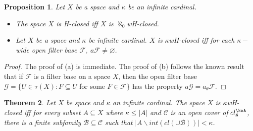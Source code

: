 \documentclass[11pt]{amsart}
\newif\ifdraft\draftfalse
\newtheorem{theorem}{Theorem}[section]
\newtheorem{proposition}[theorem]{Proposition}
\theoremstyle{definition}
\theoremstyle{remark}
\numberwithin{equation}{section}
\begin{document}
\begin{proposition}{{\immediate{}}{\ifdraft\hspace{-\lastskip}\vadjust{\vspace{-1mm}\smash{\llap{{\tt {{propA}}}\hspace{8mm}}}\vspace{1mm}}\fi}}
 Let $X$ be a space and $\kappa$ be an infinite cardinal.
\begin{itemize}
\item[(a)] The space $X$ is H-closed iff $X$ is $\aleph_0$wH-closed.
\item[(b)]  Let $X$ be a space and $\kappa$ be infinite cardinal.  $X$ is $\kappa$wH-closed iff for each $\kappa-$wide open filter base ${\ensuremath{\mathcal{{F}}}}$, $a{\ensuremath{\mathcal{{F}}}}\ne \varnothing$.

\end{itemize}
\end{proposition}

\begin{proof}
The proof of (a) is immediate. The proof of (b) follows the known result that if ${\ensuremath{\mathcal{{F}}}}$ is a filter base on a space $X$, then the open filter base ${\ensuremath{\mathcal{{G}}}} = \{U \in \tau(X): F \subseteq U$ for some $F \in {\ensuremath{\mathcal{{F}}}}\}$ has the property $a{\ensuremath{\mathcal{{G}}}} = a_{\theta}{\ensuremath{\mathcal{{F}}}}$.
\end{proof}

\begin{theorem}{{\immediate{}}{\ifdraft\hspace{-\lastskip}\vadjust{\vspace{-1mm}\smash{\llap{{\tt {{kwHchar}}}\hspace{8mm}}}\vspace{1mm}}\fi}} 
Let $X$ be space and $\kappa$ an infinite cardinal.  The space $X$ is 
$\kappa$wH-closed iff for every subset $A \subseteq X$ where $\kappa \leq |A|$ and ${\ensuremath{\mathcal{{C}}}}$ is an open cover of $cl_{\theta }^\kaA $, there is a finite subfamily ${\ensuremath{\mathcal{{B}}}} \subseteq{\ensuremath{\mathcal{{C}}}}$ such that $|A\backslash int(cl(\cup{\ensuremath{\mathcal{{B}}}}))| < \kappa$.  
\end{theorem}
\end{document}
